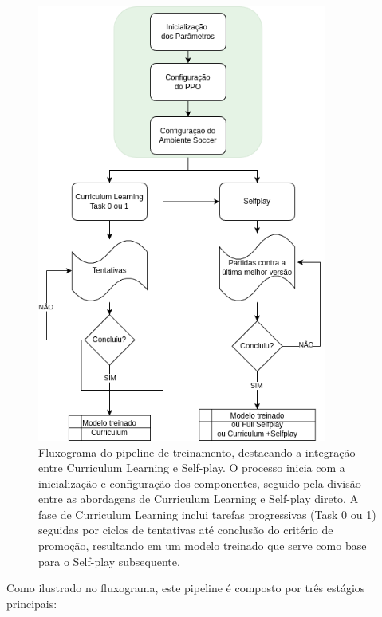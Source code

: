 \begin{figure}[H]
    \centering
    \includegraphics[width=0.85\textwidth]{fig/fluxograma_treino_mestrado.png}
    \caption{Fluxograma do pipeline de treinamento, destacando a integração entre Curriculum Learning e Self-play. O processo inicia com a inicialização e configuração dos componentes, seguido pela divisão entre as abordagens de Curriculum Learning e Self-play direto. A fase de Curriculum Learning inclui tarefas progressivas (Task 0 ou 1) seguidas por ciclos de tentativas até conclusão do critério de promoção, resultando em um modelo treinado que serve como base para o Self-play subsequente.}
    \label{fig:fluxograma_treino}
\end{figure}

Como ilustrado no fluxograma, este pipeline é composto por três estágios principais:

